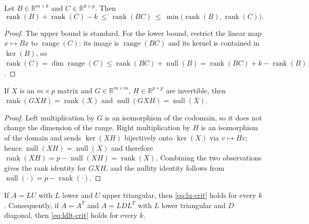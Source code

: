 \documentclass[preprint,12pt]{elsarticle}
\theoremstyle{plain}
\theoremstyle{nonumberplain}
\newtheorem{proof}{Proof}
\numberwithin{equation}{section}
\DeclareMathOperator{\rk}{rank}
\DeclareMathOperator{\nl}{null}
\DeclareMathOperator{\range}{range}
\newcommand{\by}{\times}
\numberwithin{theorem}{section}
\begin{document}
\begin{lemma}\label{lem:sylvester}
  Let $B \in \mathbb{R}^{m \by k}$ and $C \in \mathbb{R}^{k \by p}$.  Then
  \[
    \rk(B) + \rk(C) - k \ \le\ \rk(BC) \ \le\ \min\bigl(\rk(B), \rk(C)\bigr) .
  \]
\end{lemma}

\begin{proof}
  The upper bound is standard.  For the lower bound, restrict the linear map
  $x \mapsto Bx$ to $\range(C)$: its image is $\range(BC)$ and its kernel is
  contained in $\ker(B)$, so
  $\rk(C) = \dim \range(C) \le \rk(BC) + \nl(B) = \rk(BC) + k - \rk(B)$.
\end{proof}

\begin{lemma}\label{lem:rank-invariance}
  If $X$ is an $m \by p$ matrix and $G \in \mathbb{R}^{m \by m}$,
  $H \in \mathbb{R}^{p \by p}$ are invertible, then
  $\rk(GXH) = \rk(X)$ and $\nl(GXH) = \nl(X)$.
\end{lemma}

\begin{proof}
  Left multiplication by $G$ is an isomorphism of the codomain, so it does not
  change the dimension of the range.  Right multiplication by $H$ is an
  isomorphism of the domain and sends $\ker(XH)$ bijectively onto $\ker(X)$ via
  $v \mapsto Hv$; hence $\nl(XH)=\nl(X)$ and therefore
  $\rk(XH)=p-\nl(XH)=\rk(X)$.  Combining the two observations gives the rank
  identity for $GXH$, and the nullity identity follows from
  $\nl(\cdot)=p-\rk(\cdot)$.
\end{proof}

\begin{proposition}[necessity]\label{prop:necessity}
  If $A = LU$ with $L$ lower and $U$ upper triangular, then
  \cref{eq:lu-crit} holds for every $k$.  Consequently, if $A = A^T$ and
  $A = LDL^T$ with $L$ lower triangular and $D$ diagonal, then
  \cref{eq:ldlt-crit} holds for every $k$.
\end{proposition}
\end{document}
